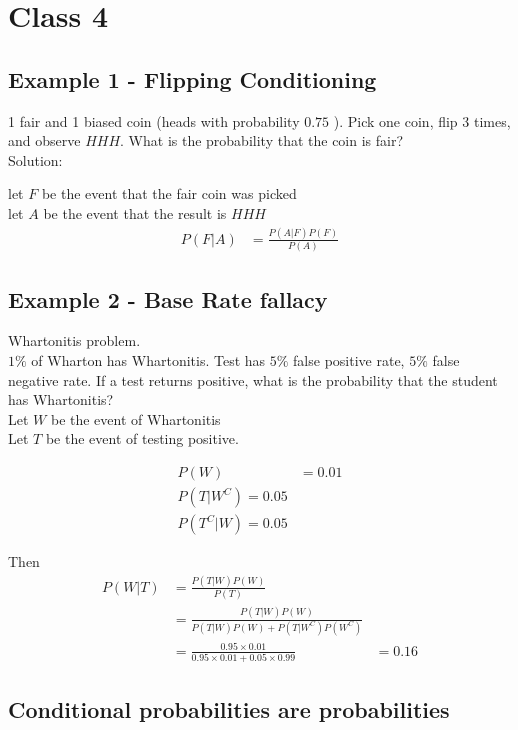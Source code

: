 \chapter{Class 4}

\section{Example 1 - Flipping Conditioning}
1 fair and 1 biased coin (heads with probability $0.75$ ). Pick one coin, flip 3 times, and observe $HHH$. What is the probability that the coin is fair? \\

Solution:

let $F$ be the event that the fair coin was picked\\
let $A$ be the event that the result is $HHH$ \\
\begin{align*}
   P(F|A) &= \frac{P(A|F) P(F)}{P(A)}
\end{align*}


\section{Example 2 - Base Rate fallacy}
Whartonitis problem. \\

$1\%$ of Wharton has Whartonitis. Test has $5\%$ false positive rate, $5\%$ false negative rate. If a test returns positive, what is the probability that the student has Whartonitis? \\

Let $W $ be the event of Whartonitis\\
Let $T$ be the event of testing positive. 

\begin{align*}
   P(W) &= 0.01 \\
   P(T |W^C) = 0.05  \\
   P(T^C |W) = 0.05
\end{align*}

Then
\begin{align*}
   P(W|T) &= \frac{P(T|W)P(W)}{P(T)} \\
          &= \frac{P(T|W) P(W)}{P(T|W) P(W) + P(T|W^C) P(W^C)} \\
          &= \frac{0.95 \times 0.01}{0.95 \times 0.01 + 0.05 \times 0.99}
          &= 0.16
\end{align*}

\section{Conditional probabilities are probabilities}

